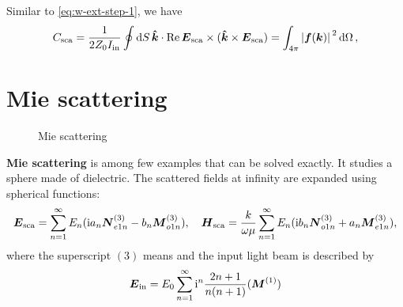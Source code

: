 \documentclass[hyperref, a4paper]{article}
\newcommand*{\ii}{\mathrm{i}}
\newcommand*{\concept}[1]{{\textbf{#1}}}
\begin{document}
Similar to \eqref{eq:w-ext-step-1}, we have 
\begin{equation}
    C_\text{sca} = \frac{1}{2 Z_0 I_\text{in}} \oint \dd{S} \vu*{k} \cdot \Re \vb*{E}_\text{sca} \times (\vu*{k} \times \vb*{E}_\text{sca}) = \int_{4\pi} \abs*{\vb*{f}(\vb*{k})}^2 \dd{\Omega},
\end{equation}

\section{Mie scattering}

\begin{figure}
    \centering
    
    \caption{Mie scattering}
\end{figure}

\concept{Mie scattering} is among few examples that can be solved exactly. It studies a sphere made of 
dielectric. The scattered fields at infinity are expanded using spherical functions:
\begin{equation}
    \vb*{E}_\text{sca} = \sum_{n=1}^\infty E_n (\ii a_n \vb*{N}^{(3)}_{e1n} - b_n \vb*{M}^{(3)}_{o1n}), \quad 
    \vb*{H}_\text{sca} = \frac{k}{\omega \mu} \sum_{n=1}^\infty E_n (\ii b_n \vb*{N}^{(3)}_{o1n} + a_n \vb*{M}^{(3)}_{e1n}),
\end{equation}
where the superscript $(3)$ means %
and the input light beam is described by 
\begin{equation}
    \vb*{E}_\text{in} = E_0 \sum_{n=1}^\infty \ii^n \frac{2n+1}{n(n+1)} (\vb*{M}^{(1)})
\end{equation}
\end{document}
